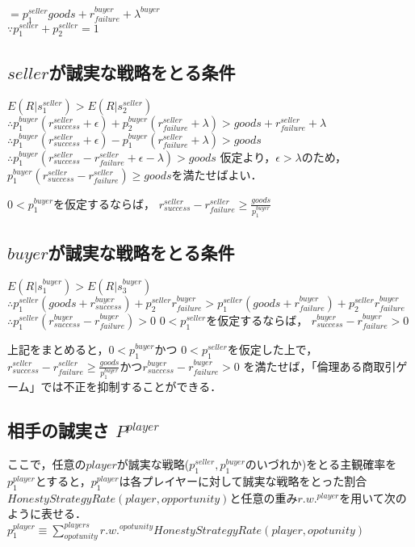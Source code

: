 $ = p^{seller}_1 goods + r^{buyer}_{failure} + \lambda^{buyer} $ \\

$ \because p^{seller}_1 + p^{seller}_2 = 1 $ \\


\subsection{$ seller $が誠実な戦略をとる条件}

$ E(R|s^{seller}_1) > E(R|s^{seller}_2) $
$ \therefore p^{buyer}_1 (r^{seller}_{success} + \epsilon) + p^{buyer}_2 (r^{seller}_{failure} + \lambda) > goods + r^{seller}_{failure} + \lambda $
$ \therefore p^{buyer}_1(r^{seller}_{success} + \epsilon) - p^{buyer}_1(r^{seller}_{failure} + \lambda) > goods $
$ \therefore p^{buyer}_1(r^{seller}_{success} - r^{seller}_{failure} + \epsilon - \lambda) > goods $
仮定より，$ \epsilon > \lambda $のため，
$ p^{buyer}_1 (r^{seller}_{success} - r^{seller}_{failure}) \geq goods $を満たせばよい．

$ 0 < p^{buyer}_1 $を仮定するならば，
$ r^{seller}_{success} - r^{seller}_{failure} \geq \frac{goods}{p^{buyer}_1} $


\subsection{$ buyer $が誠実な戦略をとる条件}

$ E(R|s^{buyer}_1) > E(R|s^{buyer}_3) $
$ \therefore p^{seller}_1 (goods + r^{buyer}_{success}) + p^{seller}_2 r^{buyer}_{failure} > p^{seller}_1(goods+r^{buyer}_{failure}) + p^{seller}_2 r^{buyer}_{failure} $
$ \therefore p^{seller}_1(r^{buyer}_{success} - r^{buyer}_{failure}) > 0 $
$ 0 < p^{seller}_1 $を仮定するならば，
$ r^{buyer}_{success} - r^{buyer}_{failure} > 0 $

上記をまとめると，$ 0<p^{buyer}_1 $かつ $ 0 < p^{seller}_{1} $を仮定した上で，
$ r^{seller}_{success} - r^{seller}_{failure} \geq \frac{goods}{p^{buyer}_1} $かつ$ r^{buyer}_{success} - r^{buyer}_{failure} > 0 $
を満たせば，「倫理ある商取引ゲーム」では不正を抑制することができる．


\subsection{相手の誠実さ $ P^{player} $}

ここで，任意の$ player $が誠実な戦略($ p^{seller}_1, p^{buyer}_1 $のいづれか)をとる主観確率を$ p^{player}_1 $とすると，$ p^{player}_1 $は各プレイヤーに対して誠実な戦略をとった割合$ HonestyStrategyRate(player, opportunity) $と任意の重み$ r.w.^{player} $を用いて次のように表せる．
$ p^{player}_1 \equiv \sum^{players}_{opotunity} r.w.^{opotunity} HonestyStrategyRate(player, opotunity) $


